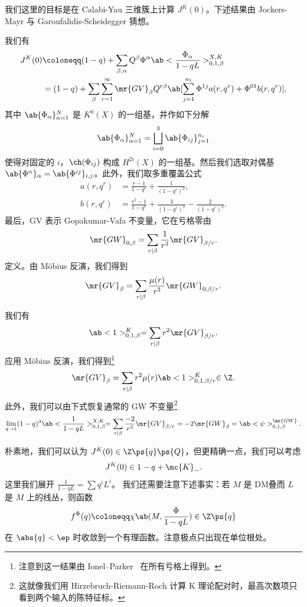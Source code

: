 我们这里的目标是在 Calabi-Yau 三维簇上计算 \(J^K(0)\)。下述结果由 Jockers-Mayr 与 Garoufalidis-Scheidegger 猜想。

\begin{thm}
    我们有
    \begin{align*}
        J^K(0) &\coloneqq (1-q) + \sum_{\beta, \alpha} Q^{\beta} \Phi^{\alpha} \ab<\frac{\Phi_{\alpha}}{1-qL}>_{0,1,\beta}^{X,K} \\
        &= (1-q) + \sum_{\beta} \sum_{r=1}^{\infty} \mr{GV}_{\beta} Q^{r\beta} \ab[\sum_{j=1}^{n_1} \Phi^{1j} a(r, q^r) + \Phi^{01} b(r, q^r)],
    \end{align*}
    其中 \(\ab\{\Phi_{\alpha}\}_{\alpha=1}^N\) 是 \(K^0(X)\) 的一组基，并作如下分解
    \[ \ab\{\Phi_{\alpha}\}_{\alpha=1}^N = \bigsqcup_{i=0}^3 \ab\{\Phi_{ij}\}_{j=1}^{n_i} \]
    使得对固定的 \(i\)，\(\ch(\Phi_{ij})\) 构成 \(H^{2i}(X)\) 的一组基。然后我们选取对偶基 \(\ab\{\Phi^{\alpha}\}_{\alpha} = \ab\{\Phi^{ij}\}_{i,j}\)。此外，我们取多重覆盖公式
    \begin{align*}
        a(r, q^r) &= \frac{r-1}{1-q^r} + \frac{1}{(1-q^r)^2}, \\
        b(r, q^r) &= \frac{r^2-1}{1-q^r} + \frac{3}{(1-q^r)^2} - \frac{2}{(1-q^r)^3}.
    \end{align*}
    最后，GV 表示 Gopakumar-Vafa 不变量，它在亏格零由
    \[ \mr{GW}_{0,\beta} = \sum_{r \mid \beta} \frac{1}{r^3} \mr{GV}_{\beta/r}. \]
    定义。由 M\"obius 反演，我们得到
    \[ \mr{GV}_{\beta} = \sum_{r \mid \beta} \frac{\mu(r)}{r^3} \mr{GW}_{0,\beta/r}. \]
\end{thm}

\begin{cor}
    我们有
    \[ \ab<1>_{0,1,\beta}^K = \sum_{r \mid \beta} r^2 \mr{GV}_{\beta/r}. \]
    应用 M\"obius 反演，我们得到\footnote{注意到这一结果由 Ionel--Parker~\cite{IonelParker2018} 在所有亏格上得到。}
    \[ \mr{GV}_{\beta} = \sum_{r \mid \beta} r^2 \mu(r) \ab<1>_{0,1,\beta/r}^K \in \Z. \]
    此外，我们可以由下式恢复通常的 GW 不变量\footnote{这就像我们用 Hirzebruch-Riemann-Roch 计算 K 理论配对时，最高次数项只看到两个输入的陈特征标。}
    \[ \lim_{q \to 1} (1-q)^3 \ab<\frac{1}{1-qL}>_{0,1,\beta}^{X,K} = \sum_{r \mid \beta} \frac{-2}{r^3} \mr{GV}_{\beta/r} = -2 \mr{GW}_{\beta} = \ab<\psi>_{0,1,\beta}^{\mr{GW}}. \]
\end{cor}

朴素地，我们可以认为 \(J^K(0) \in \Z\ps{q}\ps{Q}\)，但更精确一点，我们可以考虑
\[ J^K(0) \in 1-q + \mc{K}_-. \]
这里我们展开 \(\frac{1}{1-qL} = \sum q^i L^i\)。
我们还需要注意下述事实：若 \(M\) 是 DM叠而 \(L\) 是 \(M\) 上的线丛，则函数
\[ f^{\Phi}(q) \coloneqq \chi\ab(M, \frac{\Phi}{1-qL}) \in \Z \ps{q} \]
在 \(\abs{q} < \ep\) 时收敛到一个有理函数。注意极点只出现在单位根处。

